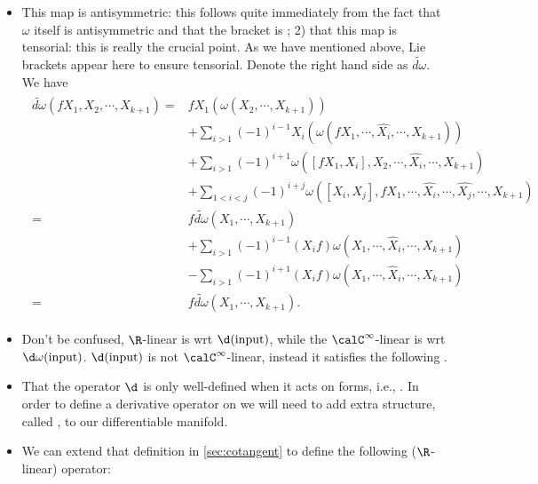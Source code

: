 \documentclass{article}
\begin{document}
\begin{enumerate}
\begin{itemize}
\item This map is antisymmetric: this follows quite immediately from the fact that $\omega$ itself is antisymmetric and that the bracket is ; 2) that this map is tensorial: this is really the crucial point. As we have mentioned above, Lie brackets appear here to ensure tensorial.
{\tiny  Denote the right hand side as $\widetilde{d \omega}$. We have \begin{align*}
\begin{aligned}
\widetilde{d \omega}\left(f X_1, X_2, \cdots, X_{k+1}\right)=& f X_1\left(\omega\left(X_2, \cdots, X_{k+1}\right)\right) \\
&+\sum_{i>1}(-1)^{i-1} X_i\left(\omega\left(f X_1, \cdots, \widehat{X_i}, \cdots, X_{k+1}\right)\right) \\
&+\sum_{i>1}(-1)^{i+1} \omega\left(\left[f X_1, X_i\right], X_2, \cdots, \widehat{X_i}, \cdots, X_{k+1}\right) \\
&+\sum_{1<i<j}(-1)^{i+j} \omega\left(\left[X_i, X_j\right], f X_1, \cdots, \widehat{X_i}, \cdots, \widehat{X_j}, \cdots, X_{k+1}\right) \\
=& f \widetilde{d \omega}\left(X_1, \cdots, X_{k+1}\right) \\
&+\sum_{i>1}(-1)^{i-1}\left(X_i f\right) \omega\left(X_1, \cdots, \widehat{X}_i, \cdots, X_{k+1}\right) \\
&-\sum_{i>1}(-1)^{i+1}\left(X_i f\right) \omega\left(X_1, \cdots, \widehat{X}_i, \cdots, X_{k+1}\right) \\
=& f \widetilde{d \omega}\left(X_1, \cdots, X_{k+1}\right) .
\end{aligned}
\end{align*}
}
\item Don't be confused, $\R$-linear is \gls{wrt} $\d(\text{input})$, while the $\calC^\infty$-linear is \gls{wrt} $\d \omega (\text{input})$. $\d(\text{input})$ is not $\calC^\infty$-linear, instead it satisfies the following .
    \item {} That the operator $\d$ is only well-defined when it acts on forms, i.e., . In order to define a derivative operator on  we will need to add extra structure, called , to our differentiable manifold.
    \item {} We can extend that definition in \cref{sec:cotangent} to define the following ($\R$-linear) operator:

\end{itemize}
\end{enumerate}
\end{document}
